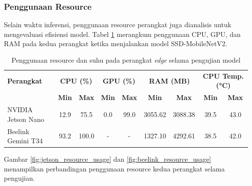 \subsubsection{Penggunaan Resource}

Selain waktu inferensi, penggunaan resource perangkat juga dianalisis untuk mengevaluasi efisiensi model. Tabel \ref{tab:resource_usage} merangkum penggunaan CPU, GPU, dan RAM pada kedua perangkat ketika menjalankan model SSD-MobileNetV2.

\begin{table}[htbp]
  \centering
  \small
  \begin{tabular}{|l|c|c|c|c|c|c|c|c|}
  \hline
  \rowcolor[HTML]{C0C0C0}
  \textbf{Perangkat} & \multicolumn{2}{c|}{\textbf{CPU (\%)}} & \multicolumn{2}{c|}{\textbf{GPU (\%)}} & \multicolumn{2}{c|}{\textbf{RAM (MB)}} & \multicolumn{2}{c|}{\textbf{CPU Temp. (°C)}} \\
  \cline{2-9}
  \rowcolor[HTML]{C0C0C0}
  & \textbf{Min} & \textbf{Max} & \textbf{Min} & \textbf{Max} & \textbf{Min} & \textbf{Max} & \textbf{Min} & \textbf{Max} \\
  \hline
  NVIDIA Jetson Nano & 12.9 & 75.5 & 0.0 & 99.0 & 3055.62 & 3088.38 & 39.5 & 43.0 \\
  \hline
  Beelink Gemini T34 & 93.2 & 100.0 & - & - & 1327.10 & 4292.61 & 38.5 & 42.0 \\
  \hline
  \end{tabular}
  \caption{Penggunaan resource dan suhu pada perangkat \emph{edge} selama pengujian model}
  \label{tab:resource_usage}
\end{table}

Gambar \ref{fig:jetson_resource_usage} dan \ref{fig:beelink_resource_usage} menampilkan perbandingan penggunaan resource kedua perangkat selama pengujian.

